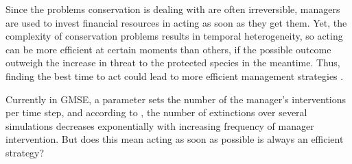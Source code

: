 \documentclass[12pt,a4paper]{article}
\begin{document}
Since the problems conservation is dealing with are often irreversible, managers are used to invest financial resources in acting as soon as they get them.
Yet, the complexity of conservation problems results in temporal heterogeneity, so acting can be more efficient at certain moments than others, if the possible outcome outweigh the increase in threat to the protected species in the meantime.
Thus, finding the best time to act could lead to more efficient management strategies \citep{Iacona2017waiting}.
%

Currently in GMSE, a parameter sets the number of the manager's interventions per time step, and according to \cite{duthie2018}, the number of extinctions over several simulations decreases exponentially with increasing frequency of manager intervention.
But does this mean acting as soon as possible is always an efficient strategy?\\
\end{document}
